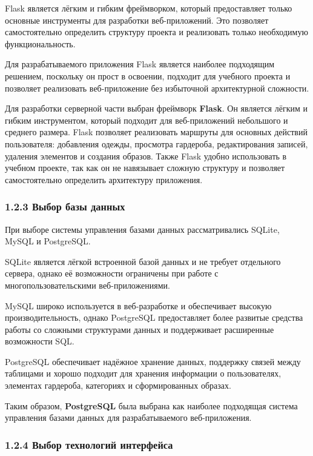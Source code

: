Flask является лёгким и гибким фреймворком, который предоставляет только основные инструменты для разработки веб-приложений. Это позволяет самостоятельно определить структуру проекта и реализовать только необходимую функциональность.

Для разрабатываемого приложения Flask является наиболее подходящим решением, поскольку он прост в освоении, подходит для учебного проекта и позволяет реализовать веб-приложение без избыточной архитектурной сложности.

Для разработки серверной части выбран фреймворк \textbf{Flask}. Он является лёгким и гибким инструментом, который подходит для веб-приложений небольшого и среднего размера. Flask позволяет реализовать маршруты для основных действий пользователя: добавления одежды, просмотра гардероба, редактирования записей, удаления элементов и создания образов. Также Flask удобно использовать в учебном проекте, так как он не навязывает сложную структуру и позволяет самостоятельно определить архитектуру приложения.

\subsubsection*{\hspace{1.25cm}1.2.3 Выбор базы данных}

При выборе системы управления базами данных рассматривались SQLite, MySQL и PostgreSQL.

SQLite является лёгкой встроенной базой данных и не требует отдельного сервера, однако её возможности ограничены при работе с многопользовательскими веб-приложениями.

MySQL широко используется в веб-разработке и обеспечивает высокую производительность, однако PostgreSQL предоставляет более развитые средства работы со сложными структурами данных и поддерживает расширенные возможности SQL.

PostgreSQL обеспечивает надёжное хранение данных, поддержку связей между таблицами и хорошо подходит для хранения информации о пользователях, элементах гардероба, категориях и сформированных образах.

Таким образом, \textbf{PostgreSQL} была выбрана как наиболее подходящая система управления базами данных для разрабатываемого веб-приложения.

\subsubsection*{\hspace{1.25cm}1.2.4 Выбор технологий интерфейса}

